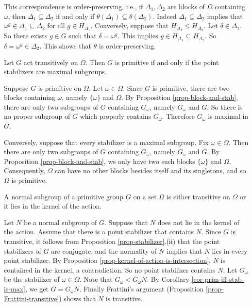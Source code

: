 \begin{remark}
	This correspondence is order-preserving, i.e., if $\Delta_1,\Delta_2$ are blocks of $\Omega$ containing $\omega$, then $\Delta_1\subseteq \Delta_2$ if and only if $\theta(\Delta_1)\subseteq \theta(\Delta_2)$. Indeed $\Delta_1\subseteq \Delta_2$ implies that $\omega^g \in \Delta_1\subseteq \Delta_2$ for all $g\in H_{\Delta_1}$. Conversely, suppose that $H_{\Delta_1}\leq H_{\Delta_2}$. Let $\delta\in \Delta_1$. So there exists $g\in G$ such that $\delta = \omega^g$. This implies $g\in H_{\Delta_1}\subseteq H_{\Delta_2}$. So $\delta = \omega^g \in \Delta_2$. This shows that $\theta$ is order-preserving.
\end{remark}

\begin{corollary} \label{cor-prim-iff-stab-is-max}
	Let $G$ act transitively on $\Omega$. Then $G$ is primitive if and only
	if the point stabilizers are maximal subgroups.
\end{corollary}
\begin{sketch}
	Suppose $G$ is primitive on $\Omega$. Let $\omega \in \Omega$.  Since $G$ is primitive, there are  two  blocks containing $\omega$, namely $\{\omega\}$ and $\Omega$.  By Proposition \ref{prop-block-and-stab}, there are only two subgroups of $G$ containing $G_\omega$, namely $G_\omega$ and $G$. So there is no proper subgroup of $G$ which properly contains $G_\omega$. Therefore $G_\omega$ is maximal in $G$.
	
	Conversely, suppose that every stabilizer is a maximal subgroup. Fix $\omega\in \Omega$. Then there are only two subgroups of $G$ containing $G_\omega$, namely $G_\omega$ and $G$. By Proposition \ref{prop-block-and-stab}, we only have two such blocks $\{\omega\}$ and $\Omega$.  Consequently, $\Omega$ can have no other blocks besides itself and its singletons, and so $\Omega$ is primitive.
\end{sketch}

\begin{corollary} \label{cor-normal-subgrp-of-prim-grp}
	A normal subgroup of a primitive  group $G$ on a set $\Omega$ is either transitive on $\Omega$ or it lies in the kernel of the action.
\end{corollary}
\begin{sketch}
	Let $N$ be a normal subgroup of $G$. Suppose that $N$ does not lie in the kernel of the action. Assume that there is a point stabilizer that contains $N$.  Since $G$ is transitive, it follows from Proposition \ref{prop-stabilizer}.(ii) that the point stabilizers of $G$ are conjugate, and the normality of $N$ implies that $N$ lies in every point stabilizer. By Proposition \ref{prop-kernel-of-action-is-intersection}, $N$ is contained in the kernel, a contradiction. So no point stabilizer contains $N$. Let $G_\omega$ be the stabilizer of $\omega\in\Omega$. Note that $G_\omega<G_\omega N$. By Corollary \ref{cor-prim-iff-stab-is-max}, we get $G = G_\omega N$. Finally Frattini's argument (Proposition \ref{prop-Frattini-transitive}) shows that $N$ is transitive.
\end{sketch}

